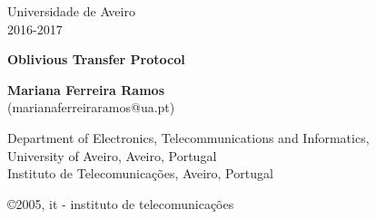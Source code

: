 \documentclass[5pt]{article}
\newcommand{\br}[1]{{\textbf{\color{itred} #1}}}%
\begin{document}
\begin{titlepage}  

\color{itblue} \sffamily \noindent \small
\hspace*{1cm}  Universidade de Aveiro\\ %
\hspace*{1cm}  2016-2017\\ %

\vspace*{1cm}
\begin{center}
    \color{black} \sffamily \noindent \Large
    \br{Oblivious Transfer Protocol\\}
\end{center}
\vspace{6mm}
\begin{center}
    \color{black}
    \textbf{Mariana Ferreira Ramos\\}
    {(marianaferreiraramos@ua.pt)}
\end{center}

\vspace{0.0mm}
\scriptsize
\begin{center}
Department of Electronics, Telecommunications and Informatics,\\
University of Aveiro, Aveiro, Portugal\\
Instituto de Telecomunica\c{c}\~{o}es, Aveiro, Portugal\\
\end{center}

\vspace{1.0cm}
\hspace*{13.2cm}\tiny \copyright 2005, it - instituto de telecomunica\c{c}\~{o}es\hfill

\end{titlepage}


\renewcommand{\headsep}{-25pt}

\end{document}
